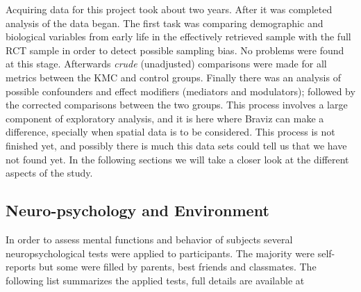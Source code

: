 Acquiring data for this project took about two years. After it was completed analysis of the data began. The first task was comparing demographic and biological variables from early life in the effectively retrieved sample with the full RCT sample in order to detect possible sampling bias. No problems were found at this stage. Afterwards \emph{crude} (unadjusted) comparisons were made for all metrics between the KMC and control groups. Finally there was an analysis of possible confounders and effect modifiers (mediators and modulators); followed by the corrected comparisons between the two groups. This process involves a large component of exploratory analysis, and it is here where Braviz can make a difference, specially when spatial data is to be considered. This process is not finished yet, and possibly there is much this data sets could tell us that we have not found yet. In the following sections we will take a closer look at the different aspects of the study.

\subsection{Neuro-psychology and Environment}

In order to assess mental functions and behavior of subjects several neuropsychological tests were applied to participants. The majority were self-reports but some were filled by parents, best friends and classmates. The following list summarizes the applied tests, full details are available at \autocite{uriza_reporte_2015}


